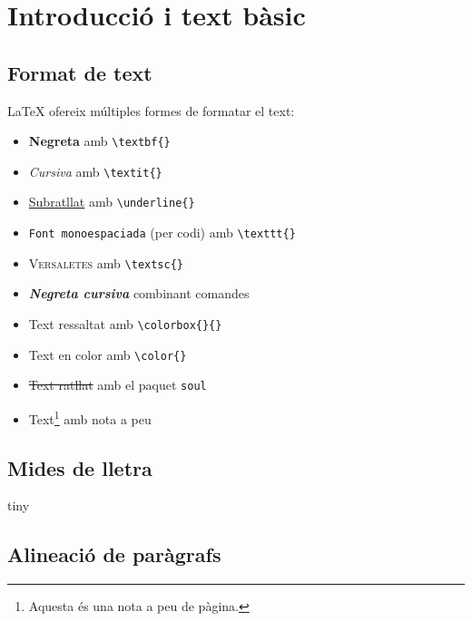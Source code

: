 \documentclass[informe, catalan]{practicaitic}
\theoremstyle{definition}
\theoremstyle{remark}
\begin{document}
\section{Introducció i text bàsic}

\subsection{Format de text}

LaTeX ofereix múltiples formes de formatar el text:

\begin{itemize}
  \item \textbf{Negreta} amb \texttt{\textbackslash textbf\{\}}
  \item \textit{Cursiva} amb \texttt{\textbackslash textit\{\}}
  \item \underline{Subratllat} amb \texttt{\textbackslash underline\{\}}
  \item \texttt{Font monoespaciada} (per codi) amb \texttt{\textbackslash texttt\{\}}
  \item \textsc{Versaletes} amb \texttt{\textbackslash textsc\{\}}
  \item \textbf{\textit{Negreta cursiva}} combinant comandes
  \item \colorbox{yellow!40}{Text ressaltat} amb \texttt{\textbackslash colorbox\{\}\{\}}
  \item {\color{myblue} Text en color} amb \texttt{\textbackslash color\{\}}
  \item \st{Text ratllat} amb el paquet \texttt{soul}
  \item Text\footnote{Aquesta és una nota a peu de pàgina.} amb nota a peu
\end{itemize}

\subsection{Mides de lletra}

{\tiny tiny}  
  
  

\subsection{Alineació de paràgrafs}
\end{document}
